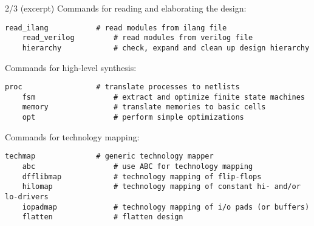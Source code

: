 \begin{frame}[fragile]{\subsecname{} 2/3 \hspace{0pt plus 1 filll} (excerpt)}
Commands for reading and elaborating the design:
\begin{lstlisting}[xleftmargin=1cm, basicstyle=\ttfamily\fontsize{8pt}{10pt}\selectfont, language=ys]
    read_ilang           # read modules from ilang file
    read_verilog         # read modules from verilog file
    hierarchy            # check, expand and clean up design hierarchy
\end{lstlisting}

\bigskip
Commands for high-level synthesis:
\begin{lstlisting}[xleftmargin=1cm, basicstyle=\ttfamily\fontsize{8pt}{10pt}\selectfont, language=ys]
    proc                 # translate processes to netlists
    fsm                  # extract and optimize finite state machines
    memory               # translate memories to basic cells
    opt                  # perform simple optimizations
\end{lstlisting}

\bigskip
Commands for technology mapping:
\begin{lstlisting}[xleftmargin=1cm, basicstyle=\ttfamily\fontsize{8pt}{10pt}\selectfont, language=ys]
    techmap              # generic technology mapper
    abc                  # use ABC for technology mapping
    dfflibmap            # technology mapping of flip-flops
    hilomap              # technology mapping of constant hi- and/or lo-drivers
    iopadmap             # technology mapping of i/o pads (or buffers)
    flatten              # flatten design
\end{lstlisting}
\end{frame}

